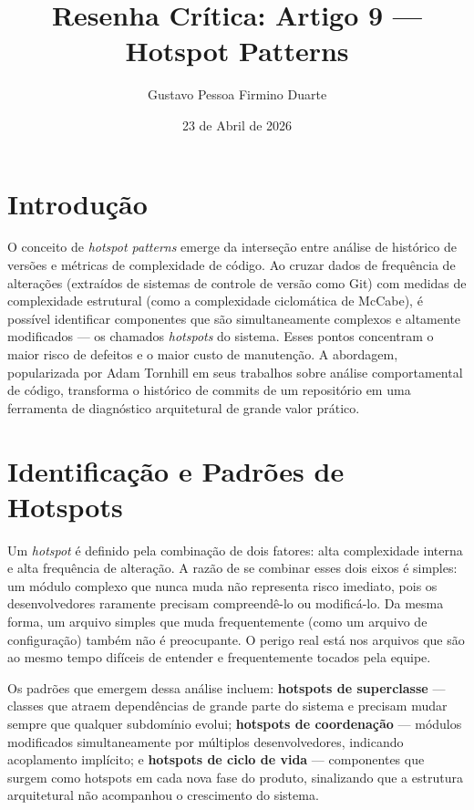 \documentclass[12pt,a4paper]{article}
\title{Resenha Cr\'itica: Artigo 9 ---\\
Hotspot Patterns}
\author{Gustavo Pessoa Firmino Duarte}
\date{23 de Abril de 2026}
\begin{document}
\maketitle

\section{Introdu\c{c}\~ao}

O conceito de \textit{hotspot patterns} emerge da interseção entre an\'alise de
hist\'orico de vers\~oes e m\'etricas de complexidade de c\'odigo. Ao cruzar dados
de frequência de altera\c{c}\~oes (extra\'idos de sistemas de controle de versão
como Git) com medidas de complexidade estrutural (como a complexidade ciclom\'atica
de McCabe), \'e poss\'ivel identificar componentes que s\~ao simultaneamente
complexos e altamente modificados --- os chamados \textit{hotspots} do sistema.
Esses pontos concentram o maior risco de defeitos e o maior custo de manuten\c{c}\~ao.
A abordagem, popularizada por Adam Tornhill em seus trabalhos sobre an\'alise
comportamental de c\'odigo, transforma o hist\'orico de commits de um reposit\'orio
em uma ferramenta de diagn\'ostico arquitetural de grande valor pr\'atico.

\section{Identifica\c{c}\~ao e Padr\~oes de Hotspots}

Um \textit{hotspot} \'e definido pela combina\c{c}\~ao de dois fatores: alta
complexidade interna e alta frequ\^encia de altera\c{c}\~ao. A raz\~ao de se
combinar esses dois eixos \'e simples: um m\'odulo complexo que nunca muda n\~ao
representa risco imediato, pois os desenvolvedores raramente precisam compreend\^e-lo
ou modific\'a-lo. Da mesma forma, um arquivo simples que muda frequentemente
(como um arquivo de configura\c{c}\~ao) tamb\'em n\~ao \'e preocupante. O perigo
real est\'a nos arquivos que s\~ao ao mesmo tempo dif\'iceis de entender e
frequentemente tocados pela equipe.

Os padr\~oes que emergem dessa an\'alise incluem: \textbf{hotspots de superclasse}
--- classes que atraem depend\^encias de grande parte do sistema e precisam mudar
sempre que qualquer subdom\'inio evolui; \textbf{hotspots de coordena\c{c}\~ao}
--- m\'odulos modificados simultaneamente por m\'ultiplos desenvolvedores, indicando
acoplamento impl\'icito; e \textbf{hotspots de ciclo de vida} --- componentes que
surgem como hotspots em cada nova fase do produto, sinalizando que a estrutura
arquitetural n\~ao acompanhou o crescimento do sistema.
\end{document}

